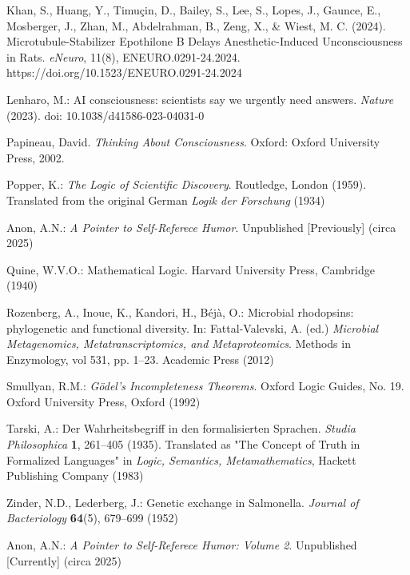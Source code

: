 \documentclass[runningheads]{llncs}
\begin{document}
\begin{thebibliography}{99}
 Khan, S., Huang, Y., Timuçin, D., Bailey, S., Lee, S., Lopes, J., Gaunce, E., Mosberger, J., Zhan, M., Abdelrahman, B., Zeng, X., \& Wiest, M. C. (2024). Microtubule-Stabilizer Epothilone B Delays Anesthetic-Induced Unconsciousness in Rats. \emph{eNeuro}, 11(8), ENEURO.0291-24.2024. https://doi.org/10.1523/ENEURO.0291-24.2024

 Lenharo, M.: AI consciousness: scientists say we urgently need answers. \emph{Nature} (2023). doi: 10.1038/d41586-023-04031-0

 Papineau, David. \emph{Thinking About Consciousness}. Oxford: Oxford University Press, 2002.

 Popper, K.: \emph{The Logic of Scientific Discovery}. Routledge, London (1959). Translated from the original German \emph{Logik der Forschung} (1934)

 Anon, A.N.: \emph{A Pointer to Self-Referece Humor}. Unpublished [Previously] (circa 2025)

 Quine, W.V.O.: Mathematical Logic. Harvard University Press, Cambridge (1940)

 Rozenberg, A., Inoue, K., Kandori, H., Béjà, O.: Microbial rhodopsins: phylogenetic and functional diversity. In: Fattal-Valevski, A. (ed.) \emph{Microbial Metagenomics, Metatranscriptomics, and Metaproteomics}. Methods in Enzymology, vol 531, pp. 1--23. Academic Press (2012)

 Smullyan, R.M.: \emph{Gödel's Incompleteness Theorems}. Oxford Logic Guides, No. 19. Oxford University Press, Oxford (1992)

 Tarski, A.: Der Wahrheitsbegriff in den formalisierten Sprachen. \emph{Studia Philosophica} \textbf{1}, 261--405 (1935). Translated as "The Concept of Truth in Formalized Languages" in \emph{Logic, Semantics, Metamathematics}, Hackett Publishing Company (1983)

 Zinder, N.D., Lederberg, J.: Genetic exchange in Salmonella. \emph{Journal of Bacteriology} \textbf{64}(5), 679--699 (1952)

 Anon, A.N.: \emph{A Pointer to Self-Referece Humor: Volume 2}. Unpublished [Currently] (circa 2025)

\end{thebibliography}
\end{document}
